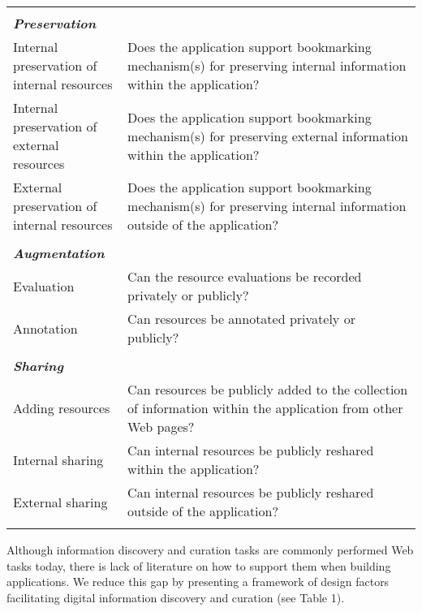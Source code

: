 \documentclass{casconpaper}
\begin{document}
{\begin{table*}[htbp]
\begin{tabular}{|p{0.28\linewidth}|p{0.72\linewidth}|}
&\\
\emph{\textbf{Preservation}}                   &                                                                                                           \\
Internal preservation of internal resources       & Does the application support bookmarking mechanism(s) for preserving internal information within the application?        \\
Internal preservation of external resources       & Does the application support bookmarking mechanism(s) for preserving external information within the application?        \\
External preservation of internal resources      & Does the application support bookmarking mechanism(s) for preserving internal information outside of the application? \\ 
&\\
\emph{\textbf{Augmentation}}            &                                                                                                           \\
Evaluation                   & Can the resource evaluations be recorded privately or publicly? \\
Annotation                   & Can resources be annotated privately or publicly?                                                                               \\    
&\\        
\emph{\textbf{Sharing}}            &                                                                                                           \\
Adding resources             & Can resources be publicly added to the collection of information within the application from other Web pages?     \\
Internal sharing         & Can internal resources be publicly reshared within the application?         \\ 
External sharing          & Can internal resources be publicly reshared outside of the application?         \\ 
&\\           
\hline
\end{tabular}
\end{table*}

Although information discovery and curation tasks are commonly performed Web tasks today, there is lack of literature on how to support them when building applications. We reduce this gap by presenting a framework of design factors facilitating digital information discovery and curation (see Table 1). 

}
\end{document}
